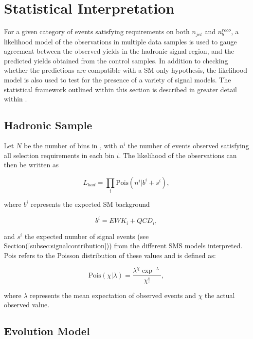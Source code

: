 \section{Statistical Interpretation}
\label{sec:statframework}

For a given category of events satisfying requirements on both $n_{jet}$ and $n_{b}^{reco}$, a likelihood model of the observations in multiple data samples is used to gauge agreement between the observed yields in the hadronic signal region, and the predicted yields obtained from the control samples. In addition to checking whether the predictions are compatible with a \ac{SM} only hypothesis, the likelihood model is also used to test for the presence of a variety of signal models. The statistical framework outlined within this section is described in greater detail within \cite{Laird:2012mla}.

\subsection{Hadronic Sample}

Let $N$ be the number of bins in \theht, with $n^{i}$ the number of events observed satisfying all selection requirements in each \theht bin $i$. The likelihood of the observations can then be written as

\begin{equation}
L_{had} =   \prod_{i}\text{Pois}(n^{i}\rvert b^{i} + s^{i}),
\end{equation}

where $b^{i}$ represents the expected \ac{SM} background 

\begin{equation}
\label{eq:totbacksum}
b^{i} = EWK_{i} + QCD_{i},
\end{equation}

and $s^{i}$ the expected number of signal events (see Section(\ref{subsec:signalcontribution})) from the different \ac{SMS} models interpreted. Pois refers to the Poisson distribution of these values and is defined as:

\begin{equation}
\text{Pois}(\chi\rvert\lambda) = \frac{\lambda^{\chi}\exp^{-\lambda}}{\chi!},
\end{equation}
 
where $\lambda$ represents the mean expectation of observed events and $\chi$ the actual observed value.
 
\subsection{\theht Evolution Model}
\label{subsec:htevolution}

